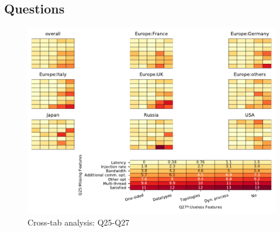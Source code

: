 
\subsection{Questions}


\begin{figure}
\begin{center}
\includegraphics[width=12cm]{../pdfs/Q25-Q27.pdf}
\caption{Cross-tab analysis: Q25-Q27}
\label{fig:Q25-Q27}
\end{center}
\end{figure}
